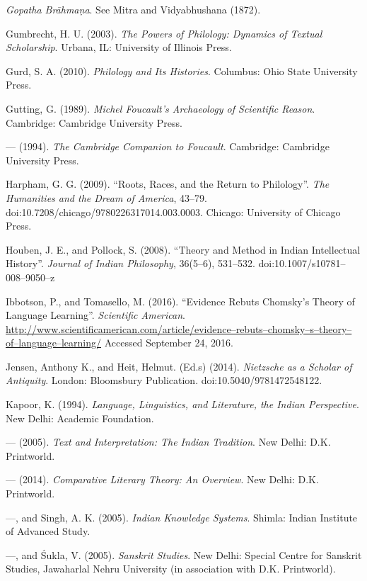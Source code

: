 \begin{thebibliography}{99}
  \textit{Gopatha Brāhmaṇa}. See Mitra and Vidyabhushana (1872).

  Gumbrecht, H. U. (2003). \textit{The Powers of Philology: Dynamics of Textual Scholarship}. Urbana, IL: University of Illinois Press.

  Gurd, S. A. (2010). \textit{Philology and Its Histories}. Columbus: Ohio State University Press.

  Gutting, G. (1989). \textit{Michel Foucault's Archaeology of Scientific Reason}. Cambridge: Cambridge University Press.

  — (1994). \textit{The Cambridge Companion to Foucault}. Cambridge: Cambridge University Press.

  Harpham, G. G. (2009). “Roots, Races, and the Return to Philology”. \textit{The Humanities and the Dream of America}, 43–79. doi:10.7208/chicago/9780226317014.003.0003. Chicago: University of Chicago Press.

  Houben, J. E., and Pollock, S. (2008). “Theory and Method in Indian Intellectual History”. \textit{Journal of Indian Philosophy}, 36(5–6), 531–532. doi:10.1007/s10781–008–9050–z

  Ibbotson, P., and Tomasello, M. (2016). “Evidence Rebuts Chomsky's Theory of Language Learning”. \textit{Scientific American}. \url{http://www.scientificamerican.com/article/evidence–rebuts–chomsky–s–theory–of–language–learning/} Accessed September 24, 2016.

  Jensen, Anthony K., and Heit, Helmut. (Ed.s) (2014). \textit{Nietzsche as a Scholar of Antiquity}. London: Bloomsbury Publication. doi:10.5040/9781472548122.

  Kapoor, K. (1994). \textit{Language, Linguistics, and Literature, the Indian Perspective}. New Delhi: Academic Foundation.

  — (2005). \textit{Text and Interpretation: The Indian Tradition}. New Delhi: D.K. Printworld.

  — (2014). \textit{Comparative Literary Theory: An Overview}. New Delhi: D.K. Printworld.

  —, and Singh, A. K. (2005). \textit{Indian Knowledge Systems}. Shimla: Indian Institute of Advanced Study.

  —, and Śukla, V. (2005). \textit{Sanskrit Studies}. New Delhi: Special Centre for Sanskrit Studies, Jawaharlal Nehru University (in association with D.K. Printworld).


\end{thebibliography}
